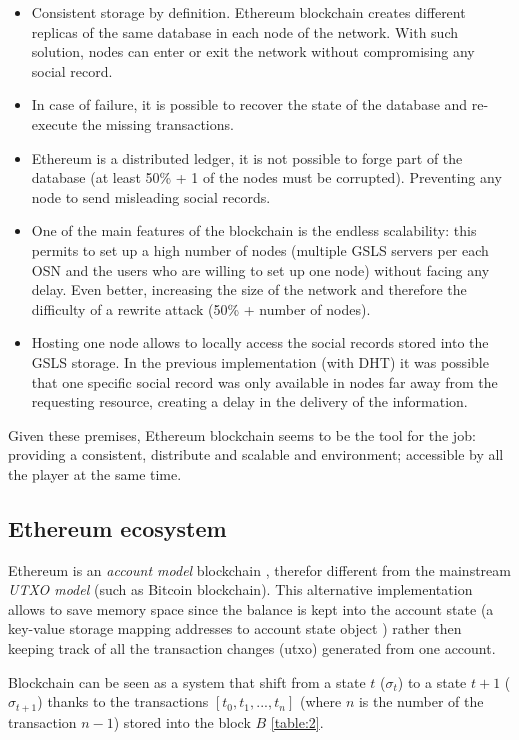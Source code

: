 \begin{itemize}
  \item Consistent storage by definition. Ethereum blockchain creates different replicas of the same database in each node of the network. With such solution, nodes can enter or exit the network without compromising any social record.
  \item In case of failure, it is possible to recover the state of the database and re-execute the missing transactions.
  \item Ethereum is a distributed ledger, it is not possible to forge part of the database (at least 50\% + 1 of the nodes must be corrupted). Preventing any node to send misleading social records.
  \item One of the main features of the blockchain is the endless scalability: this permits to set up a high number of nodes (multiple GSLS servers per each OSN and the users who are willing to set up one node) without facing any delay.
  Even better, increasing the size of the network and therefore the difficulty of a rewrite attack (50\% + number of nodes).
  \item Hosting one node allows to locally access the social records stored into the GSLS storage. In the previous implementation (with DHT) it was possible that one specific social record was only available in nodes far away from the requesting resource, creating a delay in the delivery of the information. 
\end{itemize}

Given these premises, Ethereum blockchain seems to be the tool for the job: providing a consistent, distribute and scalable and environment; accessible by all the player at the same time.


\subsection{Ethereum ecosystem}

Ethereum is an \textit{account model} blockchain \cite{ethereum_whitepaper}, therefor different from the mainstream \textit{UTXO model}  (such as Bitcoin blockchain). This alternative implementation allows to save memory space since the balance is kept into the account state (a key-value storage mapping addresses to account state object \cite{ethereum_yellowpaper}) rather then keeping track of all the transaction changes (utxo) generated from one account.

Blockchain can be seen as a system that shift from a state $t$ ($\sigma_t$) to a state $t+1$ ($\sigma_{t+1}$) thanks to the transactions $[t_0,t_1,...,t_n]$ (where $n$ is the number of the transaction $n-1$) stored into the block $B$ \ref{table:2}.


